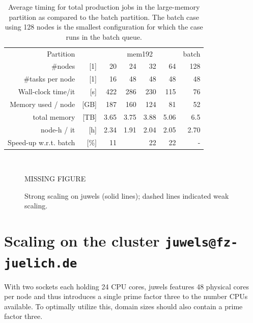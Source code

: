 \begin{table}
  \caption{Average timing for total production jobs in the large-memory partition as compared to the batch partition.
  The batch case using 128 nodes is the smallest configuration for which the case runs in the batch queue. }
  \begin{centering}{\footnotesize\begin{tabular}{rrr|r|rrr}
    \toprule
    Partition               && \multicolumn{4}{c}{mem192}&batch\\
    \#nodes                 &[1]&    20  &  24  &  32 &  64 & 128\\
    \midrule
    \rowcolor{gray!20}\#tasks per node        &[1]&    16  &  48  &  48 &  48 &  48\\
    Wall-clock time/it &[s]      &    422 &  286 & 230 & 115 & 76 \\
    \rowcolor{gray!20} Memory used / node& [GB] &    187 &  160 & 124 &  81 & 52 \\
    total memory & [TB]       &    3.65&  3.75& 3.88& 5.06& 6.5\\
    \rowcolor{gray!20}node-h / it & [h]             &    2.34& 1.91 & 2.04& 2.05& 2.70\\
    \midrule
    Speed-up w.r.t. batch & $[$\%$]$  &    11& \cellcolor{green!62}{\textbf{31}}&22&22&  -\\
    \midrule\bottomrule

  \end{tabular}}\\\end{centering}
  \label{tab:memory_juwels}
\end{table}


\begin{figure}
  MISSING FIGURE
  \caption{Strong scaling on juwels (solid lines); dashed lines indicated weak scaling.}
  \label{fig:scaling_juwels}
\end{figure}


\section{Scaling on the cluster \texttt{juwels@fz-juelich.de}} 

With two sockets each holding 24 CPU cores, juwels features 48 physical cores per node and thus 
introduces a single prime factor three to the number CPUs available. To optimally utilize this, 
domain sizes should also contain a prime factor three. 

